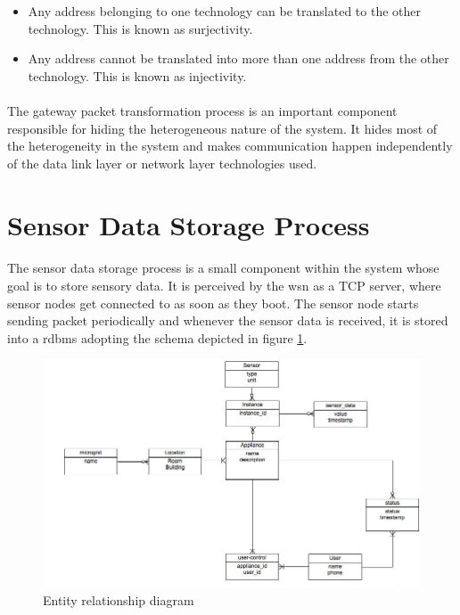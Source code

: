 \documentclass[oneside,12pt,a4paper,final]{book}
\begin{document}
\begin{itemize}
\item Any address belonging to one technology can be translated to the other technology. This is known as surjectivity.
\item Any address cannot be translated into more than one address from the other technology. This is known as injectivity.
\end{itemize}

\paragraph{}
The gateway packet transformation process is an important component responsible for hiding the heterogeneous nature of the system. It hides most of the heterogeneity in the system and makes communication happen independently of the data link layer or network layer technologies used.

\section{Sensor Data Storage Process}
\paragraph{}
The sensor data storage process is a small component within the system whose goal is to store sensory data. It is perceived by the \gls{wsn} as a TCP server, where sensor nodes get connected to as soon as they boot. The sensor node starts sending packet periodically and whenever the sensor data is received, it is stored into a \gls{rdbms} adopting the schema depicted in figure \ref{fig:erd}.

\begin{figure}[htbp]
\centering
\includegraphics[scale=0.5]{img/smart_grid_db.jpg}
\caption{Entity relationship diagram}
\label{fig:erd}
\end{figure}
\end{document}
